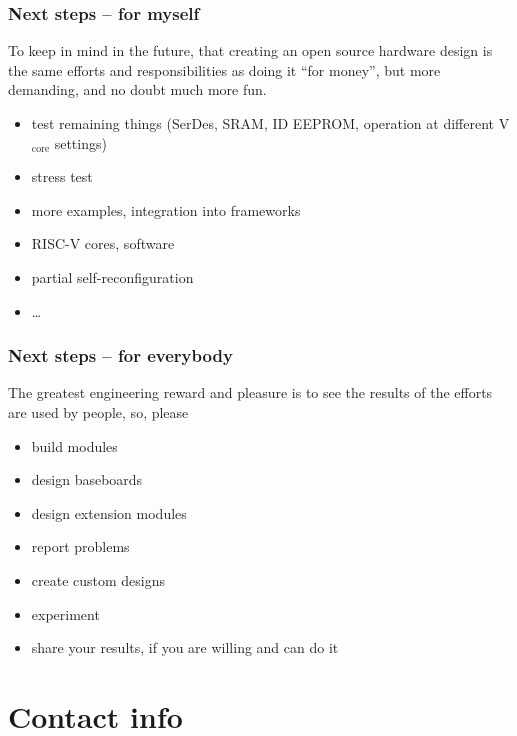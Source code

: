 \begin{frame}
  \frametitle{Next steps -- for myself}

  To keep in mind in the future, that creating an open source hardware
  design is the same efforts and responsibilities as doing it ``for
  money'', but more demanding, and no doubt much more fun.

  \begin{itemize}
  \item test remaining things (SerDes, SRAM, ID EEPROM,
  operation at different V$_{\text{core}}$ settings)
  \item stress test
  \item more examples, integration into frameworks
  \item RISC-V cores, software
  \item partial self-reconfiguration
  \item \dots
  \end{itemize}
\end{frame}

\begin{frame}
  \frametitle{Next steps -- for everybody}

  The greatest engineering reward and pleasure is to see the results
  of the efforts are used by people, so, please

  \begin{itemize}
  \item build modules
  \item design baseboards
  \item design extension modules
  \item report problems
  \item create custom designs
  \item experiment
  \item share your results, if you are willing and can do it
  \end{itemize}

\end{frame}

\section{Contact info}



